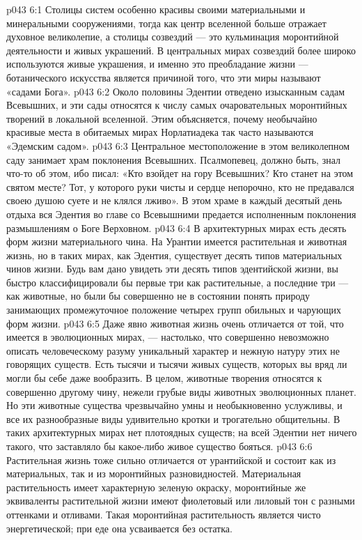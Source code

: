 \vs p043 6:1 Столицы систем особенно красивы своими материальными и минеральными сооружениями, тогда как центр вселенной больше отражает духовное великолепие, а столицы созвездий --- это кульминация моронтийной деятельности и живых украшений. В центральных мирах созвездий более широко используются живые украшения, и именно это преобладание жизни --- ботанического искусства является причиной того, что эти миры называют «садами Бога».
\vs p043 6:2 \pc Около половины Эдентии отведено изысканным садам Всевышних, и эти сады относятся к числу самых очаровательных моронтийных творений в локальной вселенной. Этим объясняется, почему необычайно красивые места в обитаемых мирах Норлатиадека так часто называются «Эдемским садом».
\vs p043 6:3 Центральное местоположение в этом великолепном саду занимает храм поклонения Всевышних. Псалмопевец, должно быть, знал что\hyp{}то об этом, ибо писал: «Кто взойдет на гору Всевышних? Кто станет на этом святом месте? Тот, у которого руки чисты и сердце непорочно, кто не предавался своею душою суете и не клялся лживо». В этом храме в каждый десятый день отдыха вся Эдентия во главе со Всевышними предается исполненным поклонения размышлениям о Боге Верховном.
\vs p043 6:4 \pc В архитектурных мирах есть десять форм жизни материального чина. На Урантии имеется растительная и животная жизнь, но в таких мирах, как Эдентия, существует десять типов материальных чинов жизни. Будь вам дано увидеть эти десять типов эдентийской жизни, вы быстро классифицировали бы первые три как растительные, а последние три --- как животные, но были бы совершенно не в состоянии понять природу занимающих промежуточное положение четырех групп обильных и чарующих форм жизни.
\vs p043 6:5 Даже явно животная жизнь очень отличается от той, что имеется в эволюционных мирах, --- настолько, что совершенно невозможно описать человеческому разуму уникальный характер и нежную натуру этих не говорящих существ. Есть тысячи и тысячи живых существ, которых вы вряд ли могли бы себе даже вообразить. В целом, животные творения относятся к совершенно другому чину, нежели грубые виды животных эволюционных планет. Но эти животные существа чрезвычайно умны и необыкновенно услужливы, и все их разнообразные виды удивительно кротки и трогательно общительны. В таких архитектурных мирах нет плотоядных существ; на всей Эдентии нет ничего такого, что заставляло бы какое\hyp{}либо живое существо бояться.
\vs p043 6:6 Растительная жизнь тоже сильно отличается от урантийской и состоит как из материальных, так и из моронтийных разновидностей. Материальная растительность имеет характерную зеленую окраску, моронтийные же эквиваленты растительной жизни имеют фиолетовый или лиловый тон с разными оттенками и отливами. Такая моронтийная растительность является чисто энергетической; при еде она усваивается без остатка.
